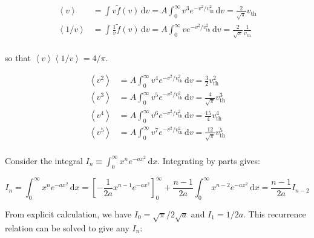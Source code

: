 \documentclass[12pt]{article}
\begin{document}
\begin{equation}
    \begin{split}
        \left\langle v \right\rangle &= \int v \tilde{f}(v) \, \mathrm{d}v = A \int_{0}^{\infty} v^{3} e^{-v^{2}/v_{\text{th}}^{2}} \, \mathrm{d}v = \frac{2}{\sqrt{\pi}} v_{\text{th}} \\
        \left\langle 1/v \right\rangle &= \int \frac{1}{v} \tilde{f}(v) \, \mathrm{d}v = A \int_{0}^{\infty} v e^{-v^{2}/v_{\text{th}}^{2}} \, \mathrm{d}v = \frac{2}{\sqrt{\pi}} \frac{1}{v_{\text{th}}} \\
    \end{split}
\end{equation}

so that $\left\langle v \right\rangle \left\langle 1/v \right\rangle = 4/\pi$.


\begin{equation}
    \begin{split}
        \left\langle v^{2} \right\rangle &= A \int_{0}^{\infty} v^{4} e^{-v^{2}/v_{\text{th}}^{2}} \, \mathrm{d}v = \frac{3}{2} v_{\text{th}}^{2} \\
        \left\langle v^{3} \right\rangle &= A \int_{0}^{\infty} v^{5} e^{-v^{2}/v_{\text{th}}^{2}} \, \mathrm{d}v = \frac{4}{\sqrt{\pi}} v_{\text{th}}^{3} \\
        \left\langle v^{4} \right\rangle &= A \int_{0}^{\infty} v^{6} e^{-v^{2}/v_{\text{th}}^{2}} \, \mathrm{d}v = \frac{15}{4} v_{\text{th}}^{4} \\
        \left\langle v^{5} \right\rangle &= A \int_{0}^{\infty} v^{7} e^{-v^{2}/v_{\text{th}}^{2}} \, \mathrm{d}v = \frac{12}{\sqrt{\pi}} v_{\text{th}}^{5} \\
    \end{split}
\end{equation}

Consider the integral $I_{n} \equiv \int_{0}^{\infty} x^{n} e^{-ax^{2}} \, \mathrm{d}x$. Integrating by parts gives:

\begin{equation}
    I_{n} = \int_{0}^{\infty} x^{n} e^{-ax^{2}} \, \mathrm{d}x = \left[ -\frac{1}{2a} x^{n-1} e^{-ax^{2}} \right]_{0}^{\infty} + \frac{n-1}{2a} \int_{0}^{\infty} x^{n-2} e^{-ax^{2}} \, \mathrm{d}x = \frac{n-1}{2a} I_{n-2}
\end{equation}

From explicit calculation, we have $I_{0} = \sqrt{\pi}/2\sqrt{a}$ and $I_{1} = 1/2a$. This recurrence relation can be solved to give any $I_{n}$:
\end{document}
